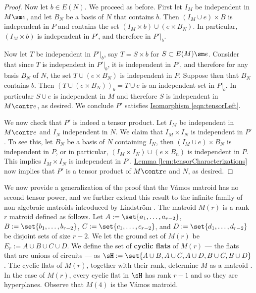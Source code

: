 \begin{proof}
        Now let $b\in E(N)$. We proceed as before. First let $I_M$ be independent in $M\sm e$, and let $B_N$ be a basis of $N$ that contains $b$. Then $(I_M\cup e)\times B$ is independent in $P$ and contains the set $(I_M\times b)\cup (e\times B_N)$. In particular, $(I_M\times b)$ is independent in $P'$, and therefore in $P'|_b$.

        
        Now let $T$ be independent in $P'|_b$, say $T=S\times b$ for $S\subset E(M)\sm e$. Consider that since $T$ is independent in $P'|_b$, it is independent in $P'$, and therefore for any basis $B_N$ of $N$, the set $T\cup (e\times B_N)$ is independent in $P$. Suppose then that $B_N$ contains $b$. Then $\left(T\cup(e\times B_N)\right)_b = T\cup e$ is an independent set in $P|_b$. In particular $S\cup e$ is independent in $M$ and therefore $S$ is independent in $M\contr e$, as desired. We conclude $P'$ satisfies \hyperref[eqn:tensorLeft]{Isomorphism \ref{eqn:tensorLeft}}.

        We now check that $P'$ is indeed a tensor product. Let $I_M$ be independent in $M\contr e$ and $I_N$ independent in $N$. We claim that $I_M\times I_N$ is independent in $P'$. To see this, let $B_N$ be a basis of $N$ containing $I_N$, then $(I_M\cup e)\times B_N$ is independent in $P$, or in particular, $(I_M\times I_N) \cup (e\times B_n)$ is independent in $P$. This implies $I_M\times I_N$ is independent in $P'$. \hyperref[lem:tensorCharacterizations]{Lemma \ref{lem:tensorCharacterizations}} now implies that $P'$ is a tensor product of $M\contr e$ and $N$, as desired.
    \end{proof}

    We now provide a generalization of the proof that the V\'amos matroid has no second tensor power, and we further extend this result to the infinite family of non-algebraic matroids introduced by Lindstr\"om \cite{Lind88}. The matroid $M(r)$ is a rank $r$ matroid defined as follows. Let $A:=\set{a_1,\dots, a_{r-2}}$, $B:=\set{b_1,\dots, b_{r-2}}$, $C:=\set{c_1,\dots, c_{r-2}}$, and $D:=\set{d_1,\dots, d_{r-2}}$ be disjoint sets of size $r-2$. We let the ground set of $M(r)$ be $E_r:= A\cup B\cup C\cup D$. We define the set of \textbf{cyclic flats} of $M(r)$ --- the flats that are unions of circuits --- as $\sH:= \set{A\cup B, A\cup C, A\cup D, B\cup C, B\cup D}$. The cyclic flats of $M(r)$, together with their rank, determine $M$ as a matroid \cite{Bry75}. In the case of $M(r)$, every cyclic flat in $\sH$ has rank $r-1$ and so they are hyperplanes. Observe that $M(4)$ is the V\'amos matroid.

